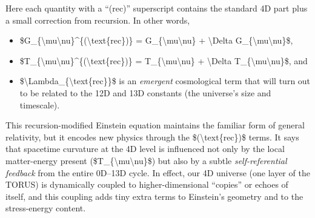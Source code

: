 \documentclass[]{article}
\begin{document}
Here each quantity with a ``(rec)'' superscript contains the standard 4D
part plus a small correction from recursion. In other words,

\begin{itemize}
\item
  \$G\_\{\textbackslash{}mu\textbackslash{}nu\}\^{}\{(\textbackslash{}text\{rec\})\}
  = G\_\{\textbackslash{}mu\textbackslash{}nu\} + \textbackslash{}Delta
  G\_\{\textbackslash{}mu\textbackslash{}nu\}\$,
\item
  \$T\_\{\textbackslash{}mu\textbackslash{}nu\}\^{}\{(\textbackslash{}text\{rec\})\}
  = T\_\{\textbackslash{}mu\textbackslash{}nu\} + \textbackslash{}Delta
  T\_\{\textbackslash{}mu\textbackslash{}nu\}\$, and
\item
  \$\textbackslash{}Lambda\_\{\textbackslash{}text\{rec\}\}\$ is an
  \emph{emergent} cosmological term that will turn out to be related to
  the 12D and 13D constants (the universe's size and timescale).
\end{itemize}

This recursion-modified Einstein equation maintains the familiar form of
general relativity, but it encodes new physics through the
\$(\textbackslash{}text\{rec\})\$ terms. It says that spacetime
curvature at the 4D level is influenced not only by the local
matter-energy present (\$T\_\{\textbackslash{}mu\textbackslash{}nu\}\$)
but also by a subtle \emph{self-referential feedback} from the entire
0D--13D cycle. In effect, our 4D universe (one layer of the TORUS) is
dynamically coupled to higher-dimensional ``copies'' or echoes of
itself, and this coupling adds tiny extra terms to Einstein's geometry
and to the stress-energy content.
\end{document}
